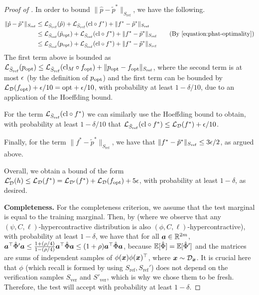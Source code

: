 \documentclass[11pt]{article} %
\numberwithin{equation}{section}
\begin{document}
\begin{proof}[Proof of ]
    In order to bound $\| \hat p - \tilde{p}^* \|_{S_{\mathrm{ref}}}$, we have the following.
    \begin{align*}
        \| \hat p - \tilde{p}^* \|_{S_{\mathrm{ref}}} &\le \gL_{\bar{S}_{\mathrm{ref}}}(\hat p) + \gL_{\bar{S}_{\mathrm{ref}}}(\clip\circ f^*) + \|f^*-\tilde{p}^*\|_{{S}_{\mathrm{ref}}} \\
        &\le \gL_{\bar{S}_{\mathrm{ref}}}(\tilde{p}_\opt) + \gL_{\bar{S}_{\mathrm{ref}}}(\clip\circ f^*) + \|f^*-\tilde{p}^*\|_{{S}_{\mathrm{ref}}} \tag{By \eqref{equation:phat-optimality}} \\
        &\le \gL_{\bar{S}_{\mathrm{ref}}}({p}_\opt) + \gL_{\bar{S}_{\mathrm{ref}}}(\clip\circ f^*) + \|f^*-\tilde{p}^*\|_{{S}_{\mathrm{ref}}} 
    \end{align*}
    The first term above is bounded as ${\mathcal{L}}_{\bar{S}_{\mathrm{ref}}}({p}_{\mathrm{opt}}) \le {\mathcal{L}}_{\bar{S}_{\mathrm{ref}}}(\mathrm{cl}_M\circ {f}_{\mathrm{opt}})+\|p_{\mathrm{opt}} - f_{\mathrm{opt}}\|_{{S}_{\mathrm{ref}}}$, where the second term is at most ${\epsilon}$ (by the definition of $p_{\mathrm{opt}}$) and the first term can be bounded by ${\mathcal{L}}_{{\mathcal{D}}}({f}_{\mathrm{opt}})+{\epsilon}/10 = \mathrm{opt}+{\epsilon}/10$, with probability at least $1-\delta/10$, due to an application of the Hoeffding bound.

    For the term ${\mathcal{L}}_{\bar{S}_{\mathrm{ref}}}(\mathrm{cl}\circ f^*)$ we can similarly use the Hoeffding bound to obtain, with probability at least $1-\delta/10$ that ${\mathcal{L}}_{\bar{S}_{\mathrm{ref}}}(\mathrm{cl}\circ f^*) \le {\mathcal{L}}_{{\mathcal{D}}}(f^*)+{\epsilon}/10$.

    Finally, for the term $\|f^*-\tilde{p}^*\|_{{S}_{\mathrm{ref}}}$, we have that $\|f^*-\tilde{p}^*\|_{{S}_{\mathrm{ref}}} \le 3{\epsilon}/2$, as argued above.

    Overall, we obtain a bound of the form ${\mathcal{L}}_{\mathcal{D}}'(h) \le {\mathcal{L}}_{{\mathcal{D}}}(f^*)={\mathcal{L}}_{{\mathcal{D}}'}(f^*) + {\mathcal{L}}_{{\mathcal{D}}}(f_{\mathrm{opt}}) + 5{\epsilon}$, with probability at least $1-\delta$, as desired.
    
    \noindent\textbf{Completeness.} For the completeness criterion, we assume that the test marginal is equal to the training marginal. Then, by  (where we observe that any $(\psi,C,\ell)$-hypercontractive distribution is also $(\phi,C,\ell)$-hypercontractive), with probability at least $1-\delta$, we have that for all ${\bm{a}}\in\mathbb{R}^{2m}$, ${\bm{a}}^\top \hat\Phi' {\bm{a}} \le \frac{1+(\rho/4)}{1-(\rho/4)}{\bm{a}}^\top \hat\Phi {\bm{a}} \le (1+\rho){\bm{a}}^\top \hat\Phi {\bm{a}}$, because $\mathbb{E}[\hat\Phi] = \mathbb{E}[\hat\Phi']$ and the matrices are sums of independent samples of $\phi({\bm{x}})\phi({\bm{x}})^\top$, where ${\bm{x}}\sim{\mathcal{D}}_{{\bm{x}}}$. It is crucial here that $\phi$ (which recall is formed by using $S_{\mathrm{ref}}, S_{\mathrm{ref}}'$) does not depend on the verification samples $S_{\mathrm{ver}}$ and $S'_{\mathrm{ver}}$, which is why we chose them to be fresh. Therefore, the test will accept with probability at least $1-\delta$.


\end{proof}
\end{document}
